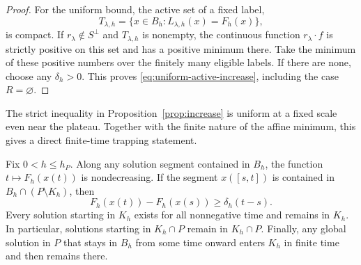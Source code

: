 \begin{proof}
For the uniform bound, the active set of a fixed label,
\[
 T_{\lambda,h}=
 \{x\in B_h:L_{\lambda,h}(x)=F_h(x)\},
\]
is compact.  If $r_\lambda\notin S^\perp$ and $T_{\lambda,h}$ is
nonempty, the continuous function $r_\lambda\cdot f$ is strictly
positive on this set and has a positive minimum there.  Take the
minimum of these positive numbers over the finitely many eligible
labels.  If there are none, choose any $\delta_h>0$.  This proves
\eqref{eq:uniform-active-increase}, including the case $R=\varnothing$.
\end{proof}

The strict inequality in Proposition~\ref{prop:increase} is uniform at
a fixed scale even near the plateau.  Together with the finite nature
of the affine minimum, this gives a direct finite-time trapping
statement.

\begin{lemma}\label{lem:trapping}
Fix $0<h\leq h_P$.  Along any solution segment contained in $B_h$,
the function $t\mapsto F_h(x(t))$ is nondecreasing.  If the segment
$x([s,t])$ is contained in $B_h\cap(P\setminus K_h)$, then
\begin{equation}\label{eq:trajectory-increase}
 F_h(x(t))-F_h(x(s))\geq\delta_h(t-s).
\end{equation}
Every solution starting in $K_h$ exists for all nonnegative time and
remains in $K_h$.  In particular, solutions starting in $K_h\cap P$
remain in $K_h\cap P$.  Finally, any global solution in $P$ that stays
in $B_h$ from some time onward enters $K_h$ in finite time and then
remains there.
\end{lemma}

